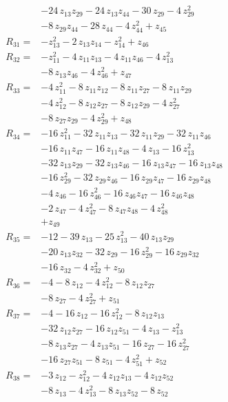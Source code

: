 \begin{align*}
&-24\,z_{13}z_{29} -24\,z_{13}z_{44} -30\,z_{29} -4\,z_{29}^{2}\\
&-8\,z_{29}z_{44} -28\,z_{44} -4\,z_{44}^{2} +z_{45}\\[2pt]
R_{31}={}&-z_{13}^{2} -2\,z_{13}z_{14} -z_{14}^{2} +z_{46}\\[2pt]
R_{32}={}&-z_{11}^{2} -4\,z_{11}z_{13} -4\,z_{11}z_{46} -4\,z_{13}^{2}\\
&-8\,z_{13}z_{46} -4\,z_{46}^{2} +z_{47}\\[2pt]
R_{33}={}&-4\,z_{11}^{2} -8\,z_{11}z_{12} -8\,z_{11}z_{27} -8\,z_{11}z_{29}\\
&-4\,z_{12}^{2} -8\,z_{12}z_{27} -8\,z_{12}z_{29} -4\,z_{27}^{2}\\
&-8\,z_{27}z_{29} -4\,z_{29}^{2} +z_{48}\\[2pt]
R_{34}={}&-16\,z_{11}^{2} -32\,z_{11}z_{13} -32\,z_{11}z_{29} -32\,z_{11}z_{46}\\
&-16\,z_{11}z_{47} -16\,z_{11}z_{48} -4\,z_{13} -16\,z_{13}^{2}\\
&-32\,z_{13}z_{29} -32\,z_{13}z_{46} -16\,z_{13}z_{47} -16\,z_{13}z_{48}\\
&-16\,z_{29}^{2} -32\,z_{29}z_{46} -16\,z_{29}z_{47} -16\,z_{29}z_{48}\\
&-4\,z_{46} -16\,z_{46}^{2} -16\,z_{46}z_{47} -16\,z_{46}z_{48}\\
&-2\,z_{47} -4\,z_{47}^{2} -8\,z_{47}z_{48} -4\,z_{48}^{2}\\
&+z_{49}\\[2pt]
R_{35}={}&-12 -39\,z_{13} -25\,z_{13}^{2} -40\,z_{13}z_{29}\\
&-20\,z_{13}z_{32} -32\,z_{29} -16\,z_{29}^{2} -16\,z_{29}z_{32}\\
&-16\,z_{32} -4\,z_{32}^{2} +z_{50}\\[2pt]
R_{36}={}&-4 -8\,z_{12} -4\,z_{12}^{2} -8\,z_{12}z_{27}\\
&-8\,z_{27} -4\,z_{27}^{2} +z_{51}\\[2pt]
R_{37}={}&-4 -16\,z_{12} -16\,z_{12}^{2} -8\,z_{12}z_{13}\\
&-32\,z_{12}z_{27} -16\,z_{12}z_{51} -4\,z_{13} -z_{13}^{2}\\
&-8\,z_{13}z_{27} -4\,z_{13}z_{51} -16\,z_{27} -16\,z_{27}^{2}\\
&-16\,z_{27}z_{51} -8\,z_{51} -4\,z_{51}^{2} +z_{52}\\[2pt]
R_{38}={}&-3\,z_{12} -z_{12}^{2} -4\,z_{12}z_{13} -4\,z_{12}z_{52}\\
&-8\,z_{13} -4\,z_{13}^{2} -8\,z_{13}z_{52} -8\,z_{52}\\

\end{align*}
